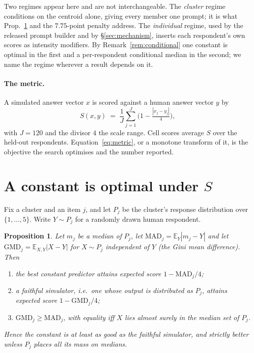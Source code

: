 \documentclass[11pt]{article}
\newtheorem{proposition}{Proposition}
\begin{document}
Two regimes appear here and are not interchangeable. The \emph{cluster} regime
conditions on the centroid alone, giving every member one prompt; it is what
Prop.~\ref{prop:main} and the $7.75$-point penalty address. The
\emph{individual} regime, used by the released prompt builder and by
\S\ref{sec:mechanism}, inserts each respondent's own scores as intensity
modifiers. By Remark~\ref{rem:conditional} one constant is optimal in the
first and a per-respondent conditional median in the second; we name the
regime wherever a result depends on it.

\paragraph{The metric.} A simulated answer vector $x$ is scored against a human
answer vector $y$ by
\begin{equation}
S(x,y) \;=\; \frac{1}{J}\sum_{j=1}^{J}\Big(1 - \tfrac{|x_j - y_j|}{4}\Big),
\label{eq:metric}
\end{equation}
with $J{=}120$ and the divisor $4$ the scale range. Cell scores average
$S$ over the held-out respondents. Equation~\eqref{eq:metric}, or a monotone
transform of it, is the objective the search optimises and the number reported.

\section{A constant is optimal under \texorpdfstring{$S$}{S}}
\label{sec:theory}

Fix a cluster and an item $j$, and let $P_j$ be the cluster's response
distribution over $\{1,\dots,5\}$. Write $Y\sim P_j$ for a randomly drawn human
respondent.

\begin{proposition}
\label{prop:main}
Let $m_j$ be a median of $P_j$, let
$\mathrm{MAD}_j = \mathbb{E}_Y|m_j - Y|$ and let
$\mathrm{GMD}_j = \mathbb{E}_{X,Y}|X-Y|$ for $X \sim P_j$ independent of $Y$
(the Gini mean difference). Then
\begin{enumerate}\itemsep0pt
\item[(a)] the best constant predictor attains expected score
$1 - \mathrm{MAD}_j/4$;
\item[(b)] a \emph{faithful} simulator, i.e.\ one whose output is distributed as
$P_j$, attains expected score $1 - \mathrm{GMD}_j/4$;
\item[(c)] $\mathrm{GMD}_j \ge \mathrm{MAD}_j$, with equality iff $X$ lies
almost surely in the median set of $P_j$.
\end{enumerate}
Hence the constant is at least as good as the faithful simulator, and strictly
better unless $P_j$ places all its mass on medians.
\end{proposition}
\end{document}
